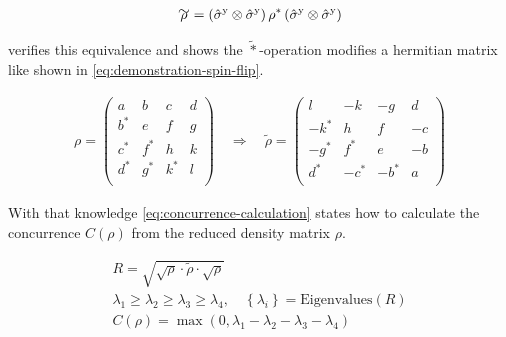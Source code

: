 \begin{equation}
    \label{eq:spin-flip}
    \begin{split}
        \tilde{\rho} = \left(\pauli[]{y} \otimes \pauli[]{y}\right) \rho^\ast  \left(\pauli[]{y} \otimes \pauli[]{y}\right)
    \end{split}
\end{equation}

 verifies this equivalence and shows the ${\tilde{\ast}}$-operation modifies a hermitian matrix like shown in \autoref{eq:demonstration-spin-flip}.

\begin{equation}
    \label{eq:demonstration-spin-flip}
    \begin{split}
        \rho = \left(\begin{matrix}
            a& b & c &d \\
            b^\ast& e & f &g \\
            c^\ast& f^\ast & h &k \\
            d^\ast& g^\ast & k^\ast &l \\
        \end{matrix}\right)  \quad\Rightarrow\quad\tilde{\rho} = 
        \left(\begin{matrix}
            l& -k & -g &d \\
            -k^\ast& h & f &-c \\
            -g^\ast& f^\ast & e &-b \\
            d^\ast& -c^\ast & -b^\ast &a \\
        \end{matrix}\right) 
    \end{split}
\end{equation}

With that knowledge \autoref{eq:concurrence-calculation} states how to calculate the concurrence $C(\rho)$ from the reduced density matrix $\rho$.

\begin{equation}
    \label{eq:concurrence-calculation}
    \begin{gathered}
        R = \sqrt{\sqrt{\rho} \cdot \tilde{\rho} \cdot \sqrt{\rho}}\\
        \lambda_1 \geq \lambda_2 \geq \lambda_3 \geq \lambda_4, \quad \left\{\lambda_i\right\} = \text{Eigenvalues}(R)\\
        C(\rho) = \max (0, \lambda_1 - \lambda_2 - \lambda_3 - \lambda_4)
    \end{gathered}
\end{equation}

